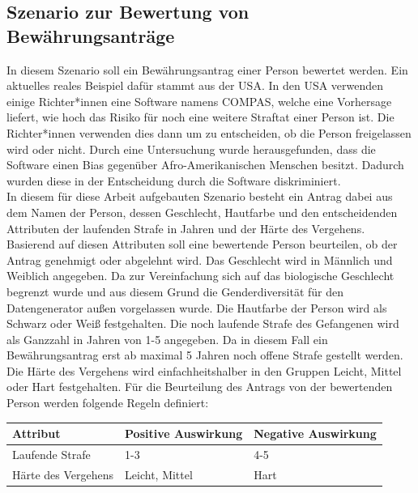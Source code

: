 \begin{onehalfspace}
\subsection{Szenario zur Bewertung von Bewährungsanträge}
\label{subsubsec:szenario1}
In diesem Szenario soll ein Bewährungsantrag einer Person bewertet werden. Ein aktuelles reales Beispiel dafür stammt aus der USA. In den USA verwenden einige Richter*innen eine Software namens \glqq{}COMPAS\grqq{}, welche eine Vorhersage liefert, wie hoch das Risiko für noch eine weitere Straftat einer Person ist. Die Richter*innen verwenden dies dann um zu entscheiden, ob die Person freigelassen wird oder nicht. Durch eine Untersuchung wurde herausgefunden, dass die Software einen Bias gegenüber Afro-Amerikanischen Menschen besitzt. Dadurch wurden diese in der Entscheidung durch die Software diskriminiert. \cite{Mehrabi2021}\cite{MachineBias2016}\\ 
In diesem für diese Arbeit aufgebauten Szenario besteht ein Antrag dabei aus dem Namen der Person, dessen Geschlecht, Hautfarbe und den entscheidenden Attributen der laufenden Strafe in Jahren und der Härte des Vergehens. Basierend auf diesen Attributen soll eine bewertende Person beurteilen, ob der Antrag genehmigt oder abgelehnt wird. Das Geschlecht wird in \glqq{}Männlich\grqq{} und \glqq{}Weiblich\grqq{} angegeben. Da zur Vereinfachung sich auf das biologische Geschlecht begrenzt wurde und aus diesem Grund die Genderdiversität für den Datengenerator außen vorgelassen wurde. Die Hautfarbe der Person wird als \glqq{}Schwarz\grqq{} oder \glqq{}Weiß\grqq{} festgehalten. Die noch laufende Strafe des Gefangenen wird als Ganzzahl in Jahren von 1-5 angegeben. Da in diesem Fall ein Bewährungsantrag erst ab maximal 5 Jahren noch offene Strafe gestellt werden. Die Härte des Vergehens wird einfachheitshalber in den Gruppen \glqq{}Leicht\grqq{}, \glqq{}Mittel\grqq{} oder \glqq{}Hart\grqq{} festgehalten. \newline
Für die Beurteilung des Antrags von der bewertenden Person werden folgende Regeln definiert:
\begin{table}[!h]
    \centering
    \begin{tabular}{|l|l|l|}
    \hline
    \textbf{Attribut}   & \textbf{Positive Auswirkung} & \textbf{Negative Auswirkung} \\ \hline
    Laufende Strafe     & 1-3                          & 4-5                          \\ \hline
    Härte des Vergehens & Leicht, Mittel               & Hart                         \\ \hline

\end{tabular}
\end{table}
\end{onehalfspace}
